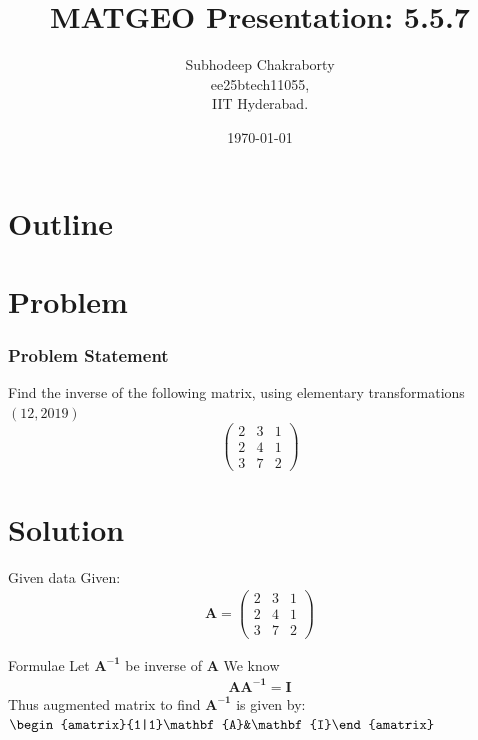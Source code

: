 \documentclass{beamer}
\title{MATGEO Presentation: 5.5.7}
\author{Subhodeep Chakraborty \\ ee25btech11055,\\IIT Hyderabad.}
\date{\today}
\providecommand{\brak}[1]{\ensuremath{\left(#1\right)}}
\theoremstyle{remark}
\newcommand{\myvec}[1]{\ensuremath{\begin{pmatrix}#1\end{pmatrix}}}
\newcommand{\augvec}[3]{\ensuremath{\begin{amatrix}{#1|#2}#3\end{amatrix}}}
\let\vec\mathbf
\numberwithin{equation}{section}
\begin{document}
\begin{frame}
\titlepage
\end{frame}

\section*{Outline}
\begin{frame}
\tableofcontents
\end{frame}

\section{Problem}
\begin{frame}
\frametitle{Problem Statement}

Find the inverse of the following matrix, using elementary transformations\hfill\brak{12, 2019}
$$\myvec{2&3&1\\2&4&1\\3&7&2}$$
\end{frame}

\section{Solution}
\begin{frame}{Given data}
Given:
\begin{align}
 \vec{A} = \myvec{2&3&1\\2&4&1\\3&7&2}
\end{align}
\end{frame}

\begin{frame}{Formulae}
Let $\vec{A^{-1}}$ be inverse of $\vec{A}$
We know \begin{align}\vec{A}\vec{A^{-1}} = \vec{I}\end{align}
Thus augmented matrix to find $\vec{A^{-1}}$ is given by: $\augvec{1}{1}{\vec{A}&\vec{I}}$
\end{frame}
\end{document}
